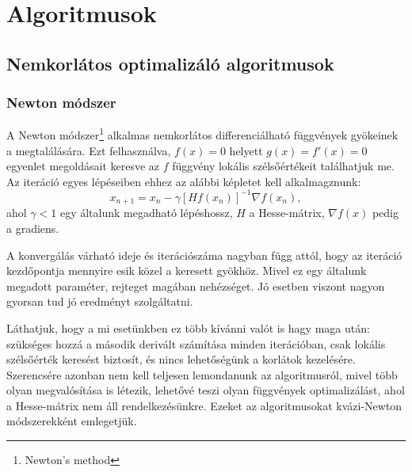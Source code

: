 \chapter{Algoritmusok}
\label{sec:algoritmusok}

\section{Nemkorlátos optimalizáló algoritmusok}

\subsection{Newton módszer}
A Newton módszer\footnote{Newton's method} alkalmas nemkorlátos differenciálható függvények gyökeinek a megtalálására. Ezt felhasználva, $f(x)=0$ helyett $g(x)=f'(x)=0$ egyenlet megoldásait keresve az $f$ függvény lokális szélsőértékeit találhatjuk me. Az iteráció egyes lépéseiben ehhez az alábbi képletet kell alkalmagznunk:
$$x_{n+1}=x_n-\gamma[Hf(x_n)]^{-1}\nabla f(x_n),$$ 
ahol $\gamma<1$ egy általunk megadható lépéshossz, $H$ a Hesse-mátrix, $\nabla f(x)$ pedig a gradiens.

A konvergálás várható ideje és iterációszáma nagyban függ attól, hogy az iteráció kezdőpontja mennyire esik közel a keresett gyökhöz. Mivel ez egy általunk megadott paraméter, rejteget magában nehézséget. Jó esetben viszont nagyon gyorsan tud jó eredményt szolgáltatni.

Láthatjuk, hogy a mi esetünkben ez több kívánni valót is hagy maga után: szükséges hozzá a második derivált számítása minden iterációban, csak lokális szélsőérték keresést biztosít, és nincs lehetőségünk a korlátok kezelésére. Szerencsére azonban nem kell teljesen lemondanunk az algoritmusról, mivel több olyan megvalósítása is létezik, lehetővé teszi olyan függvények optimalizálást, ahol a Hesse-mátrix nem áll rendelkezésünkre. Ezeket az algoritmusokat kvázi-Newton módszerekként emlegetjük.


